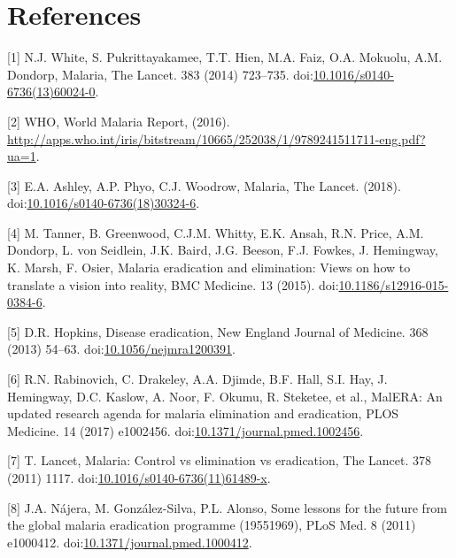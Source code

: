 \documentclass[]{article}
\begin{document}
\section*{References}\label{references}

\hypertarget{refs}{}
\hypertarget{ref-White2014}{}
{[}1{]} N.J. White, S. Pukrittayakamee, T.T. Hien, M.A. Faiz, O.A.
Mokuolu, A.M. Dondorp, Malaria, The Lancet. 383 (2014) 723--735.
doi:\href{https://doi.org/10.1016/s0140-6736(13)60024-0}{10.1016/s0140-6736(13)60024-0}.

\hypertarget{ref-World2016}{}
{[}2{]} WHO, World Malaria Report, (2016).
\url{http://apps.who.int/iris/bitstream/10665/252038/1/9789241511711-eng.pdf?ua=1}.

\hypertarget{ref-Ashley2018}{}
{[}3{]} E.A. Ashley, A.P. Phyo, C.J. Woodrow, Malaria, The Lancet.
(2018).
doi:\href{https://doi.org/10.1016/s0140-6736(18)30324-6}{10.1016/s0140-6736(18)30324-6}.

\hypertarget{ref-Tanner2015}{}
{[}4{]} M. Tanner, B. Greenwood, C.J.M. Whitty, E.K. Ansah, R.N. Price,
A.M. Dondorp, L. von Seidlein, J.K. Baird, J.G. Beeson, F.J. Fowkes, J.
Hemingway, K. Marsh, F. Osier, Malaria eradication and elimination:
Views on how to translate a vision into reality, BMC Medicine. 13
(2015).
doi:\href{https://doi.org/10.1186/s12916-015-0384-6}{10.1186/s12916-015-0384-6}.

\hypertarget{ref-Hopkins2013}{}
{[}5{]} D.R. Hopkins, Disease eradication, New England Journal of
Medicine. 368 (2013) 54--63.
doi:\href{https://doi.org/10.1056/nejmra1200391}{10.1056/nejmra1200391}.

\hypertarget{ref-Rabinovich_2017}{}
{[}6{]} R.N. Rabinovich, C. Drakeley, A.A. Djimde, B.F. Hall, S.I. Hay,
J. Hemingway, D.C. Kaslow, A. Noor, F. Okumu, R. Steketee, et al.,
MalERA: An updated research agenda for malaria elimination and
eradication, PLOS Medicine. 14 (2017) e1002456.
doi:\href{https://doi.org/10.1371/journal.pmed.1002456}{10.1371/journal.pmed.1002456}.

\hypertarget{ref-TheLancet2011}{}
{[}7{]} T. Lancet, Malaria: Control vs elimination vs eradication, The
Lancet. 378 (2011) 1117.
doi:\href{https://doi.org/10.1016/s0140-6736(11)61489-x}{10.1016/s0140-6736(11)61489-x}.

\hypertarget{ref-Njera2011}{}
{[}8{]} J.A. Nájera, M. González-Silva, P.L. Alonso, Some lessons for
the future from the global malaria eradication programme (19551969),
PLoS Med. 8 (2011) e1000412.
doi:\href{https://doi.org/10.1371/journal.pmed.1000412}{10.1371/journal.pmed.1000412}.
\end{document}
